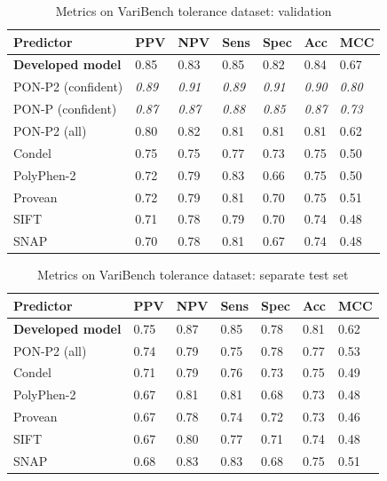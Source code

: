 \documentclass[11pt]{article}
\begin{document}
\begin{table}
\caption{Metrics on VariBench tolerance dataset: validation}
\label{table:varibench_tolerance_val}
\begin{center}
\begin{tabular}{lllllll}
\toprule
Predictor & PPV & NPV & Sens & Spec & Acc & MCC\\ 
\midrule
\textbf{Developed model} & 0.85 & 0.83 & 0.85 & 0.82 & 0.84 & 0.67   \\ 
PON-P2 (confident) & \textit{0.89} & \textit{0.91} & \textit{0.89} & \textit{0.91} & \textit{0.90} & \textit{0.80}   \\ 
PON-P (confident) & \textit{0.87} & \textit{0.87} & \textit{0.88} & \textit{0.85} & \textit{0.87} & \textit{0.73}  \\ 
PON-P2 (all) & 0.80 & 0.82 & 0.81 & 0.81 & 0.81 & 0.62   \\
Condel & 0.75 & 0.75 & 0.77 & 0.73 & 0.75 & 0.50   \\
PolyPhen-2 & 0.72 & 0.79 & 0.83 & 0.66 & 0.75 & 0.50  \\ 
Provean & 0.72 & 0.79 & 0.81 & 0.70 & 0.75 & 0.51   \\
SIFT & 0.71 & 0.78 & 0.79 & 0.70 & 0.74 & 0.48  \\ 
SNAP & 0.70 & 0.78 & 0.81 & 0.67 & 0.74 & 0.48  \\
\bottomrule
\end{tabular}
\end{center}
\end{table}

\begin{table}
\caption{Metrics on VariBench tolerance dataset: separate test set}
\label{table:varibench_tolerance_test}
\begin{center}
\begin{tabular}{lllllll}
\toprule
Predictor & PPV & NPV & Sens & Spec & Acc & MCC\\ 
\midrule
\textbf{Developed model} & 0.75 & 0.87 & 0.85 & 0.78 & 0.81 & 0.62 \\ 
PON-P2 (all) & 0.74 & 0.79 & 0.75 & 0.78 & 0.77 & 0.53  \\ 
Condel & 0.71 & 0.79 & 0.76 & 0.73 & 0.75 & 0.49  \\
PolyPhen-2 & 0.67 & 0.81 & 0.81 & 0.68 & 0.73 & 0.48  \\ 
Provean & 0.67 & 0.78 & 0.74 & 0.72 & 0.73 & 0.46  \\ 
SIFT & 0.67 & 0.80 & 0.77 & 0.71 & 0.74 & 0.48  \\
SNAP & 0.68 & 0.83 & 0.83 & 0.68 & 0.75 & 0.51  \\ 
\bottomrule
\end{tabular}
\end{center}
\end{table}
\end{document}
